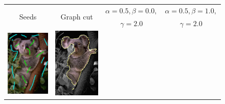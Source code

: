 \begin{figure}
\center
\begin{tabular}{cccc}
\multirow{2}{*}{Seeds} & \multirow{2}{*}{Graph cut} & $\alpha=0.5, \beta=0.0,$ & $\alpha=0.5, \beta=1.0,$\\
& & $\gamma=2.0$ & $\gamma=2.0$\\
 	\includegraphics[scale=0.25]{figures/chapter7/segmentation/coala/k-0.0/seeds.png} & 
 	\includegraphics[scale=0.25]{figures/chapter7/segmentation/coala/k-0.0/gc-seg.png} &  	

\end{tabular}
\end{figure}
